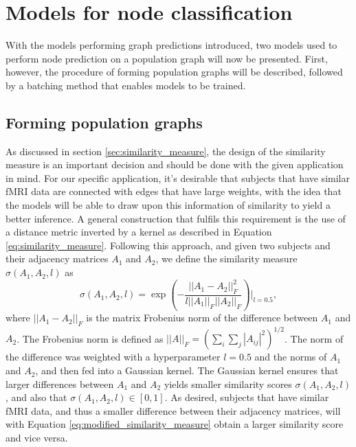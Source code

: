 \section{Models for node classification}

With the models performing graph predictions introduced, two models used to perform node prediction on a population graph will now be presented. First, however, the procedure of forming population graphs will be described, followed by a batching method that enables models to be trained.

\subsection{Forming population graphs}

As discussed in section \ref{sec:similarity_measure}, the design of the similarity measure is an important decision and should be done with the given application in mind. For our specific application, it's desirable that subjects that have similar fMRI data are connected with edges that have large weights, with the idea that the models will be able to draw upon this information of similarity to yield a better inference. A general construction that fulfils this requirement is the use of a distance metric inverted by a kernel as described in Equation \eqref{eq:similarity_measure}. Following this approach, and given two subjects and their adjacency matrices $A_1$ and $A_2$, we define the similarity measure $\sigma\left(A_1, A_2, l\right)$ as
\begin{equation}
    \sigma\left(A_1, A_2, l\right) = \exp{\left(- \frac{||A_1 - A_2||_F^2}{l||A_1||_F ||A_2||_F} \right)}\biggr\rvert_{l=0.5},
    \label{eq:modified_similarity_measure}
\end{equation}
where $||A_1 - A_2 ||_F$ is the matrix Frobenius norm of the difference between $A_1$ and $A_2$. The Frobenius norm is defined as $||A||_F = \left( \sum_i \sum_j |A_{ij}|^2 \right)^{1/2}$. The norm of the difference was weighted with a hyperparameter $l=0.5$ and the norms of $A_1$ and $A_2$, and then fed into a Gaussian kernel. The Gaussian kernel ensures that larger differences between $A_1$ and $A_2$ yields smaller similarity scores $\sigma\left(A_1, A_2, l\right)$, and also that  $\sigma\left(A_1, A_2, l\right) \in \left[0, 1\right]$. As desired, subjects that have similar fMRI data, and thus a smaller difference between their adjacency matrices, will with Equation \eqref{eq:modified_similarity_measure} obtain a larger similarity score and vice versa. 

